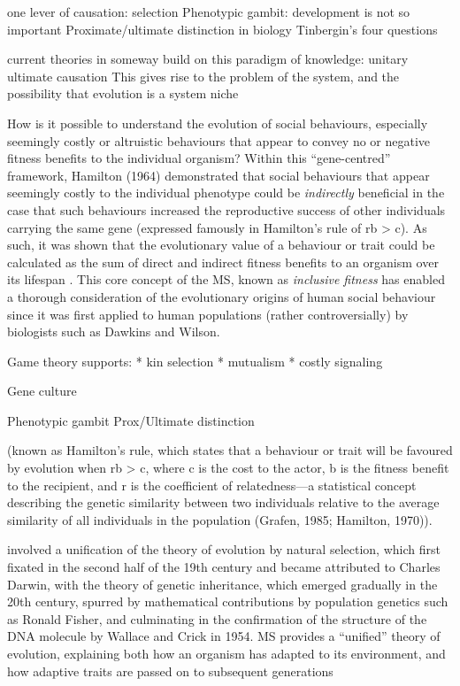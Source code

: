 one lever of causation: selection
Phenotypic gambit: development is not so important
Proximate/ultimate distinction in biology
Tinbergin's four questions

current theories in someway build on this paradigm of knowledge: unitary ultimate causation
This gives rise to the problem of the system, and the possibility that evolution is a system niche


How is it possible to understand the evolution of social behaviours, especially seemingly costly or altruistic behaviours that appear to convey no or negative fitness benefits to the individual organism? Within this ``gene-centred'' framework, Hamilton (1964) demonstrated that social behaviours that appear seemingly costly to the individual phenotype could be \textit{indirectly} beneficial in the case that such behaviours increased the reproductive success of other individuals carrying the same gene (expressed famously in Hamilton’s rule of rb > c).  As such, it was shown that the evolutionary value of a behaviour or trait could be calculated as the sum of direct and indirect fitness benefits to an organism over its lifespan \citep{Grafen2006}.  This core concept of the MS, known as \textit{inclusive fitness} has enabled a thorough consideration of the evolutionary origins of human social behaviour since it was first applied to human populations (rather controversially) by biologists such as Dawkins and Wilson.

Game theory supports:
* kin selection
* mutualism
* costly signaling


Gene culture

Phenotypic gambit
Prox/Ultimate distinction







(known as Hamilton’s rule, which states that a behaviour or trait will be favoured by evolution when rb > c, where c is the cost to the actor, b is the fitness benefit to the recipient, and r is the coefficient of relatedness—a statistical concept describing the genetic similarity between two individuals relative to the average similarity of all individuals in the population (Grafen, 1985; Hamilton, 1970)).


involved a unification of the theory of evolution by natural selection, which first fixated in the second half of the 19th century and became attributed to Charles Darwin, with the theory of genetic inheritance, which emerged gradually in the 20th century, spurred by mathematical contributions by population genetics such as Ronald Fisher, and culminating in the confirmation of the structure of the DNA molecule by Wallace and Crick in 1954.  MS provides a ``unified'' theory of evolution, explaining both how an organism has adapted to its environment, and how adaptive traits are passed on to subsequent generations

